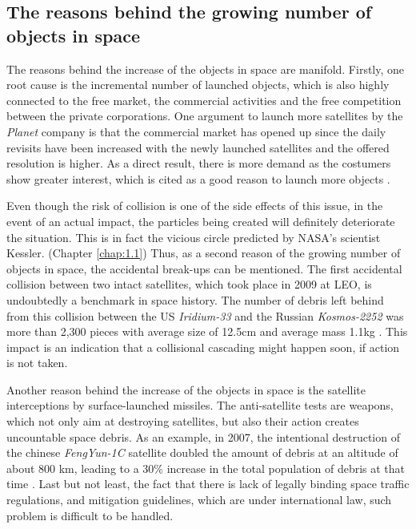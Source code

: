 \bigskip
\subsection{The reasons behind the growing number of objects in space}
\bigskip
The reasons behind the increase of the objects in space are manifold. Firstly, one root cause is the incremental number of launched objects, which is also highly connected to the free market, the commercial activities and the free competition between the private corporations. %
One argument to launch more satellites by the \textit{Planet} company is that the commercial market has opened up since the daily revisits have been increased with the newly launched satellites and the offered resolution is higher. As a direct result, there is more demand as the costumers show greater interest, which is cited as a good reason to launch more objects \cite{CNBC}.

Even though the risk of collision is one of the side effects of this issue, in the event of an actual impact, the particles being created will definitely deteriorate the situation. This is in fact the vicious circle predicted by NASA's scientist Kessler. (Chapter \ref{chap:1.1}) Thus, as a second reason of the growing number of objects in space, the accidental break-ups can be mentioned. The first accidental collision between two intact satellites, which took place in 2009 at LEO, is undoubtedly a benchmark in space history. The number of debris left behind from this collision between the US \textit{Iridium-33} and the Russian \textit{Kosmos-2252} was more than 2,300 pieces with average size of 12.5cm and average mass 1.1kg \cite{Kelso 2009}. This impact is an indication that a collisional cascading might happen soon, if action is not taken.

Another reason behind the increase of the objects in space is the satellite interceptions by surface-launched missiles. The anti-satellite tests are weapons, which not only aim at destroying satellites, but also their action creates uncountable space debris. As an example, in 2007, the intentional destruction of the chinese \textit{FengYun-1C} satellite doubled the amount of debris at an altitude of about 800 km, leading to a 30\% increase in the total population of debris at that time \cite{Anti-satellite}. Last but not least, the fact that there is lack of legally binding space traffic regulations, and mitigation guidelines, which are under international law, such problem is difficult to be handled.

